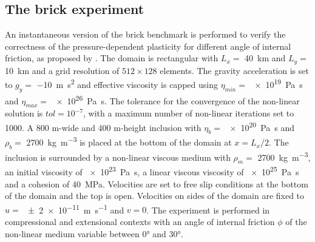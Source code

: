 \subsection{The brick experiment}\label{sec:brick}
An instantaneous version of the brick benchmark is performed to verify the correctness of the pressure-dependent plasticity for different angle of internal
friction, as proposed by \citet{Glerum2018}. The domain is rectangular with $L_x=$ \SI{40}{\km} and $L_y=$ \SI{10}{\km} and a grid resolution of $512\times128$
elements. The gravity acceleration is set to $g_y=$ \SI{-10}{\m\square\s} and effective viscosity is capped using $\eta_{min}=$ \SI{e19}{\pascal\s} and
$\eta_{max}=$ \SI{e26}{\pascal\s}. The tolerance for the convergence of the non-linear solution is $tol=10^{-7}$, with a maximum number of non-linear iterations
set to 1000. A 800 m-wide and 400 m-height inclusion with $\eta_b=$ \SI{e20}{\pascal\s} and $\rho_b=$ \SI{2700}{\kg\per\cubic\m} is placed at the bottom of the
domain at $x=L_x/2$. The inclusion is surrounded by a non-linear viscous medium with $\rho_m=$ \SI{2700}{\kg\per\cubic\m}, an initial viscosity of
\SI{e23}{\pascal\s}, a linear viscous viscosity of \SI{e25}{\pascal\s} and a cohesion of \SI{40}{\mega\pascal}. Velocities are set to free slip conditions at
the bottom of the domain and the top is open. Velocities on sides of the domain are fixed to $u=$ \SI{+-2e-11}{\m\per\s} and $v=0$. The experiment is performed
in compressional and extensional contexts with an angle of internal friction $\phi$ of the non-linear medium variable between 0° and 30°.

